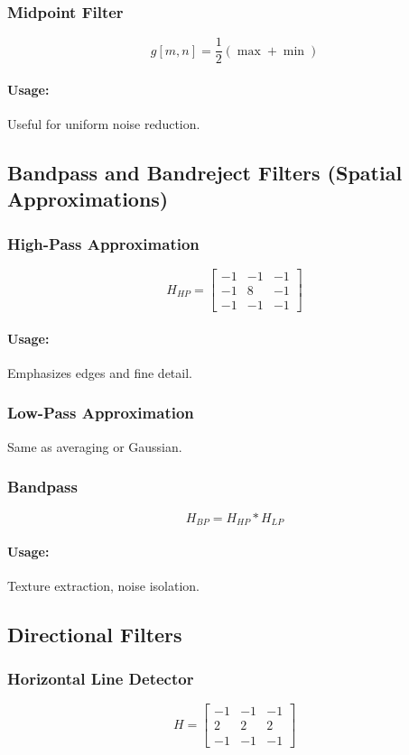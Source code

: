 \documentclass{AnantDocumentation}
\begin{document}
\subsubsection{Midpoint Filter}
\[
g[m,n] = \frac{1}{2}(\max + \min)
\]

\paragraph{Usage:}
Useful for uniform noise reduction.

\subsection{Bandpass and Bandreject Filters (Spatial Approximations)}

\subsubsection{High-Pass Approximation}
\[
H_{HP} =
\begin{bmatrix}
-1 & -1 & -1\\
-1 & 8 & -1\\
-1 & -1 & -1
\end{bmatrix}
\]

\paragraph{Usage:}
Emphasizes edges and fine detail.

\subsubsection{Low-Pass Approximation}
Same as averaging or Gaussian.

\subsubsection{Bandpass}
\[
H_{BP} = H_{HP} * H_{LP}
\]

\paragraph{Usage:}
Texture extraction, noise isolation.

\subsection{Directional Filters}

\subsubsection{Horizontal Line Detector}
\[
H =
\begin{bmatrix}
-1 & -1 & -1\\
2 & 2 & 2\\
-1 & -1 & -1
\end{bmatrix}
\]
\end{document}
